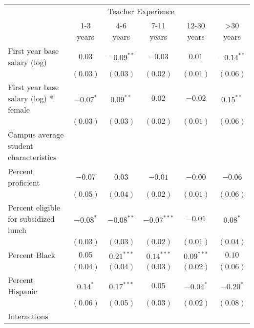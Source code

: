 \documentclass[12pt,]{article}
\begin{document}
\begin{sidewaystable}
\begin{center}
\begin{tabular}{l c c c c c }
\hline
 & \multicolumn{4}{c}{Teacher Experience} \\ \cline{2-6}
 & 1-3 years & 4-6 years & 7-11 years & 12-30 years & >30 years \\
\hline
First year base salary (log)                & $0.03$        & $-0.09^{**}$  & $-0.03$       & $0.01$       & $-0.14^{**}$ \\
                                            & $(0.03)$      & $(0.03)$      & $(0.02)$      & $(0.01)$     & $(0.06)$     \\
First year base salary (log) * female       & $-0.07^{*}$   & $0.09^{**}$   & $0.02$        & $-0.02$      & $0.15^{**}$  \\
                                            & $(0.03)$      & $(0.03)$      & $(0.02)$      & $(0.01)$     & $(0.06)$     \\
Campus average student characteristics      &               &               &               &              &              \\
\quad Percent proficient                    & $-0.07$       & $0.03$        & $-0.01$       & $-0.00$      & $-0.06$      \\
                                            & $(0.05)$      & $(0.04)$      & $(0.02)$      & $(0.01)$     & $(0.06)$     \\
\quad Percent eligible for subsidized lunch & $-0.08^{*}$   & $-0.08^{**}$  & $-0.07^{***}$ & $-0.01$      & $0.08^{*}$   \\
                                            & $(0.03)$      & $(0.03)$      & $(0.02)$      & $(0.01)$     & $(0.04)$     \\
\quad Percent Black                         & $0.05$        & $0.21^{***}$  & $0.14^{***}$  & $0.09^{***}$ & $0.10$       \\
                                            & $(0.04)$      & $(0.04)$      & $(0.03)$      & $(0.02)$     & $(0.06)$     \\
\quad Percent Hispanic                      & $0.14^{*}$    & $0.17^{***}$  & $0.05$        & $-0.04^{*}$  & $-0.20^{*}$  \\
                                            & $(0.06)$      & $(0.05)$      & $(0.03)$      & $(0.02)$     & $(0.08)$     \\
Interactions                                &               &               &               &              &              \\

\end{tabular}
\end{center}
\end{sidewaystable}
\end{document}
